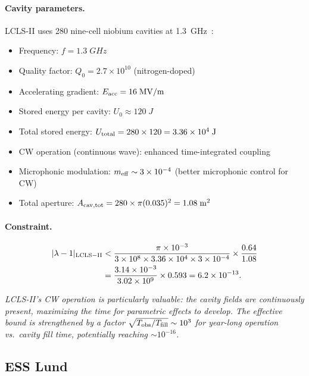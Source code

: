 \documentclass[aps,prd,twocolumn,superscriptaddress,floatfix,nofootinbib]{revtex4-2}
\newcommand{\lam}{\lambda}
\begin{document}
\paragraph{Cavity parameters.}
LCLS-II uses 280 nine-cell niobium cavities at
1.3~GHz~\cite{Raubenheimer2018}:
\begin{itemize}[nosep]
\item Frequency: $f = 1.3\;\si{GHz}$
\item Quality factor: $Q_0 = 2.7\times10^{10}$ (nitrogen-doped)
\item Accelerating gradient: $E_{\rm acc} = 16\;\si{MV/m}$
\item Stored energy per cavity: $U_0 \approx 120\;\si{J}$
\item Total stored energy: $U_{\rm total} = 280 \times 120
= 3.36\times10^4\;\si{J}$
\item CW operation (continuous wave): enhanced time-integrated
coupling
\item Microphonic modulation: $m_{\rm eff} \sim 3\times10^{-4}$
(better microphonic control for CW)
\item Total aperture: $A_{\rm cav,tot} = 280 \times \pi(0.035)^2
= 1.08\;\si{m^2}$
\end{itemize}

\paragraph{Constraint.}
\begin{align}
|\lam-1|_{\rm LCLS-II} &< \frac{\pi \times 10^{-3}}
{3\times10^8 \times 3.36\times10^4 \times 3\times10^{-4}}
\times \frac{0.64}{1.08} \notag\\
&= \frac{3.14\times10^{-3}}{3.02\times10^9} \times 0.593
= 6.2\times10^{-13}.
\end{align}

\emph{LCLS-II's CW operation is particularly valuable: the cavity
fields are continuously present, maximizing the time for parametric
effects to develop. The effective bound is strengthened by a factor
$\sqrt{T_{\rm obs}/T_{\rm fill}} \sim 10^3$ for year-long operation
vs.\ cavity fill time, potentially reaching $\sim 10^{-16}$.}

\subsection{ESS Lund}\label{sec:ess}
\end{document}
